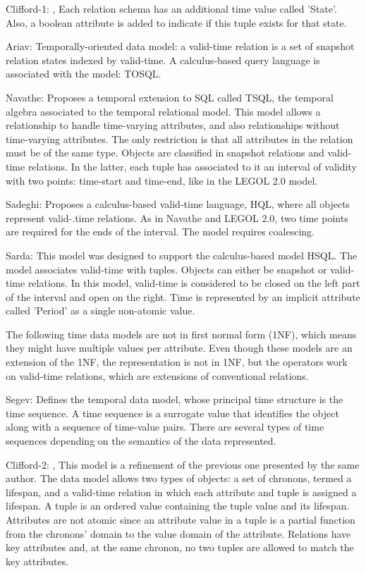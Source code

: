 Clifford-1: \cite{Clifford82},\cite{Clifford:1983:FST:319983.319986} Each relation schema has an additional time value called 'State'. Also, a boolean attribute is added to indicate if this tuple exists for that state.

Ariav: \cite{Ariav:1986:TOD:7239.7350} Temporally-oriented data model: a valid-time relation is a set of snapshot relation states indexed by valid-time. A calculus-based query language is associated with the model: TOSQL.

Navathe: \cite{TSQL} Proposes a temporal extension to SQL called TSQL, the temporal algebra associated to the temporal relational model. This model allows a relationship to handle time-varying attributes, and also relationships without time-varying attributes. The only restriction is that all attributes in the relation must be of the same type. Objects are classified in snapshot relations and valid-time relations. In the latter, each tuple has associated to it an interval of validity with two points: time-start and time-end, like in the LEGOL 2.0 model.

Sadeghi: \cite{913787} Proposes a calculus-based valid-time language, HQL, where all objects represent valid-.time relations. As in Navathe and LEGOL 2.0, two time points are required for the ends of the interval. The model requires coalescing.

Sarda: \cite{Sarda:1990:ESH:627277.627409} This model was designed to support the calculus-based model HSQL. The model associates valid-time with tuples. Objects can either be snapshot or valid-time relations. In this model, valid-time is considered to be closed on the left part of the interval and open on the right. Time is represented by an implicit attribute called 'Period' as a single non-atomic value.

The following time data models are not in first normal form (1NF), which means they might have multiple values per attribute. Even though these models are an extension of the 1NF, the representation is not in 1NF, but the operators work on valid-time relations, which are extensions of conventional relations.

Segev: \cite{Segev:1987:LMT:38714.38760} Defines the temporal data model, whose principal time structure is the time sequence. A time sequence is a surrogate value that identifies the object along with a sequence of time-value pairs. There are several types of time sequences depending on the semantics of the data represented. 

Clifford-2: \cite{Clifford:1987:HRD:645472.653241},\cite{Clifford:1985:AHR:971699.318922} This model is a refinement of the previous one presented by the same author. The data model allows two types of objects: a set of chronons, termed a lifespan, and a valid-time relation in which each attribute and tuple is assigned a lifespan. A tuple is an ordered value containing the tuple value and its lifespan. Attributes are not atomic since an attribute value in a tuple is a partial function from the chronons' domain to the value domain of the attribute. Relations have key attributes and, at the same chronon, no two tuples are allowed to match the key attributes.


